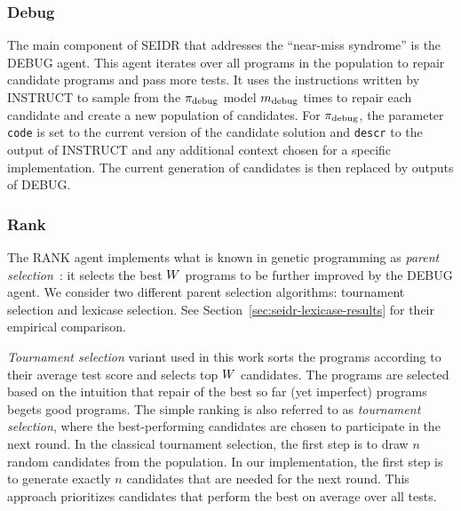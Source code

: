 \subsubsection{Debug}

The main component of SEIDR that addresses the ``near-miss syndrome'' is the DEBUG agent.  
This agent iterates over all programs in the population to repair candidate programs and pass more tests. 
It uses the instructions written by INSTRUCT to sample from the $ \pi_\text{debug} $ model $m_\text{debug}$ times
to repair each candidate and create a new population of \treearity{} candidates.
For $ \pi_\text{debug} $, the parameter \texttt{code} is set to the current version of the candidate solution and \texttt{descr} to the output of INSTRUCT and any additional context chosen for a specific implementation.
The current generation of candidates is then replaced by \treearity{} outputs of DEBUG.

\subsubsection{Rank}

The RANK agent implements what is known in genetic programming as \emph{parent selection}~\cite{koza1994:genetic}: it selects the best $W{}$ programs to be further improved by the DEBUG agent.
We consider two different parent selection algorithms: tournament selection and lexicase selection. 
See Section~\ref{sec:seidr-lexicase-results} for their empirical comparison.

\emph{Tournament selection} variant used in this work sorts the programs according to their average test score and selects top $W{}$ candidates. 
The programs are selected based on the intuition that repair of the best so far (yet imperfect) programs begets good programs. 
The simple ranking is also referred to as \emph{tournament selection}, where the best-performing candidates are chosen to participate in the next round.  
In the classical tournament selection, the first step is to draw $n$ random candidates from the population. 
In our implementation, the first step is to generate exactly $n$ candidates that are needed for the next round. 
This approach prioritizes candidates that perform the best on average over all tests.

